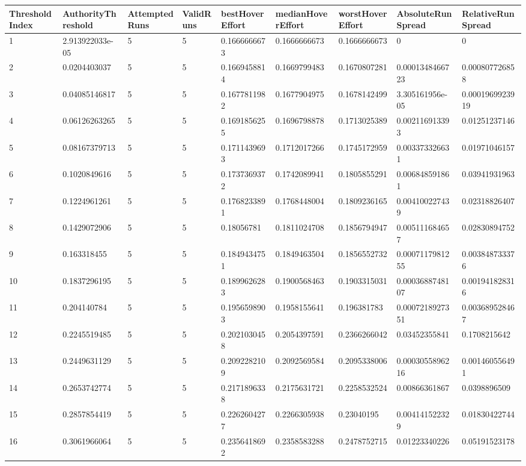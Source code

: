 \begin{tabular}{@{}lllllllll@{}}
\toprule
ThresholdIndex & AuthorityThreshold & AttemptedRuns & ValidRuns & bestHoverEffort & medianHoverEffort & worstHoverEffort & AbsoluteRunSpread & RelativeRunSpread \\
\midrule
1 & 2.913922033e-05 & 5 & 5 & 0.1666666673 & 0.1666666673 & 0.1666666673 & 0 & 0 \\
2 & 0.0204403037 & 5 & 5 & 0.1669458814 & 0.1669799483 & 0.1670807281 & 0.0001348466723 & 0.000807726858 \\
3 & 0.04085146817 & 5 & 5 & 0.1677811982 & 0.1677904975 & 0.1678142499 & 3.305161956e-05 & 0.0001969923919 \\
4 & 0.06126263265 & 5 & 5 & 0.1691856255 & 0.1696798878 & 0.1713025389 & 0.002116913393 & 0.01251237146 \\
5 & 0.08167379713 & 5 & 5 & 0.1711439693 & 0.1712017266 & 0.1745172959 & 0.003373326631 & 0.01971046157 \\
6 & 0.1020849616 & 5 & 5 & 0.1737369372 & 0.1742089941 & 0.1805855291 & 0.006848591861 & 0.03941931963 \\
7 & 0.1224961261 & 5 & 5 & 0.1768233891 & 0.1768448004 & 0.1809236165 & 0.004100227439 & 0.02318826407 \\
8 & 0.1429072906 & 5 & 5 & 0.18056781 & 0.1811024708 & 0.1856794947 & 0.005111684657 & 0.02830894752 \\
9 & 0.163318455 & 5 & 5 & 0.1849434751 & 0.1849463504 & 0.1856552732 & 0.0007117981255 & 0.003848733376 \\
10 & 0.1837296195 & 5 & 5 & 0.1899626283 & 0.1900568463 & 0.1903315031 & 0.0003688748107 & 0.001941828316 \\
11 & 0.204140784 & 5 & 5 & 0.1956598903 & 0.1958155641 & 0.196381783 & 0.0007218927351 & 0.003689528467 \\
12 & 0.2245519485 & 5 & 5 & 0.2021030458 & 0.2054397591 & 0.2366266042 & 0.03452355841 & 0.1708215642 \\
13 & 0.2449631129 & 5 & 5 & 0.2092282109 & 0.2092569584 & 0.2095338006 & 0.0003055896216 & 0.001460556491 \\
14 & 0.2653742774 & 5 & 5 & 0.2171896338 & 0.2175631721 & 0.2258532524 & 0.00866361867 & 0.0398896509 \\
15 & 0.2857854419 & 5 & 5 & 0.2262604277 & 0.2266305938 & 0.23040195 & 0.004141522329 & 0.01830422744 \\
16 & 0.3061966064 & 5 & 5 & 0.2356418692 & 0.2358583288 & 0.2478752715 & 0.01223340226 & 0.05191523178 \\

\end{tabular}
